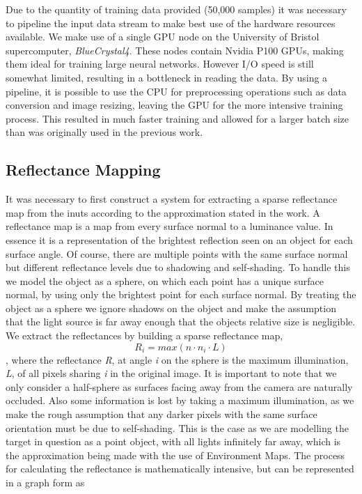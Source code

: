 \documentclass[ %
                    author={Gavin Parker},
                supervisor={Dr. Neill Campbell},
                    degree={MEng},
                     title={Deep Siamese Networks for Illumination Estimation from Stereo Images},
                  subtitle={},
                      type={research},
                      year={2018} ]{dissertation}
\begin{document}
Due to the quantity of training data provided (50,000 samples) it was necessary to pipeline the input data stream to make best use of the hardware resources available. We make use of a single GPU node on the University of Bristol supercomputer, \textit{BlueCrystal4}. These nodes contain Nvidia P100 GPUs, making them ideal for training large neural networks. However I/O speed is still somewhat limited, resulting in a bottleneck in reading the data. By using a pipeline, it is possible to use the CPU for preprocessing operations such as data conversion and image resizing, leaving the GPU for the more intensive training process. This resulted in much faster training and allowed for a larger batch size than was originally used in the previous work.
\subsection{Reflectance Mapping}
It was necessary to first construct a system for extracting a sparse reflectance map from the inuts according to the approximation stated in the work. A reflectance map is a map from every surface normal to a luminance value. In essence it is a representation of the brightest reflection seen on an object for each surface angle. Of course, there are multiple points with the same surface normal but different reflectance levels due to shadowing and self-shading. To handle this we model the object as a sphere, on which each point has a unique surface normal, by using only the brightest point for each surface normal. By treating the object as a sphere we ignore shadows on the object and make the assumption that the light source is far away enough that the objects relative size is negligible. We extract the reflectances by building a sparse reflectance map,
\[ R_i = max(n\cdot n_i \cdot L)\],
where the reflectance \textit{R}, at angle \textit{i} on the sphere is the maximum illumination, \textit{L}, of all pixels sharing \textit{i} in the original image. It is important to note that we only consider a half-sphere as surfaces facing away from the camera are naturally occluded. Also some information is lost by taking a maximum illumination, as we make the rough assumption that any darker pixels with the same surface orientation must be due to self-shading. This is the case as we are modelling the target in question as a point object, with all lights infinitely far away, which is the approximation being made with the use of Environment Maps.
\newline
The process for calculating the reflectance is mathematically intensive, but can be represented in a graph form as
\end{document}
